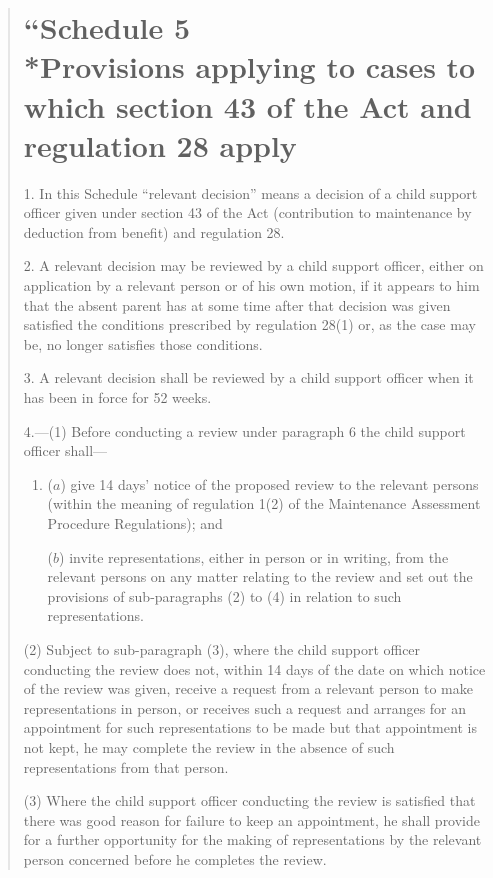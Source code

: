 \documentclass[a4paper]{article}
\begin{document}
\begin{quotation}
\part*{``Schedule 5\\*Provisions applying to cases to which section 43 of the Act and regulation 28 apply}

1.  In this Schedule “relevant decision” means a decision of a child support officer given under section 43 of the Act (contribution to maintenance by deduction from benefit) and regulation 28.

\medskip

2.  A relevant decision may be reviewed by a child support officer, either on application by a relevant person or of his own motion, if it appears to him that the absent parent has at some time after that decision was given satisfied the conditions prescribed by regulation 28(1) or, as the case may be, no longer satisfies those conditions.

\medskip

3.  A relevant decision shall be reviewed by a child support officer when it has been in force for 52 weeks.

\medskip

4.—(1) Before conducting a review under paragraph 6 the child support officer shall---
\begin{enumerate}\item[]
($a$) give 14 days' notice of the proposed review to the relevant persons (within the meaning of regulation 1(2) of the Maintenance Assessment Procedure Regulations); and

($b$) invite representations, either in person or in writing, from the relevant persons on any matter relating to the review and set out the provisions of sub-paragraphs (2) to (4) in relation to such representations.
\end{enumerate}

(2) Subject to sub-paragraph (3), where the child support officer conducting the review does not, within 14 days of the date on which notice of the review was given, receive a request from a relevant person to make representations in person, or receives such a request and arranges for an appointment for such representations to be made but that appointment is not kept, he may complete the review in the absence of such representations from that person.

(3) Where the child support officer conducting the review is satisfied that there was good reason for failure to keep an appointment, he shall provide for a further opportunity for the making of representations by the relevant person concerned before he completes the review.


\end{quotation}
\end{document}
